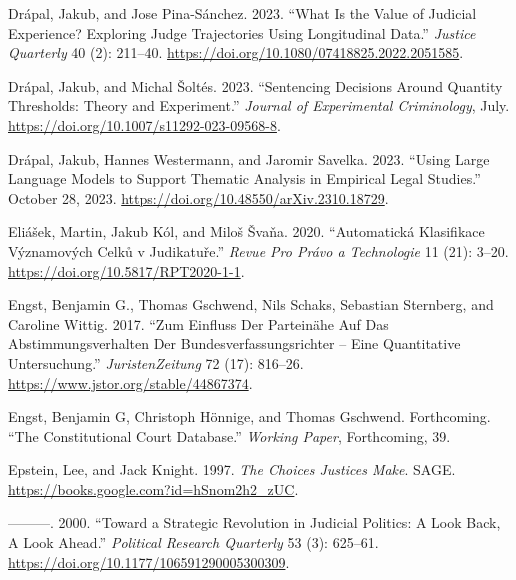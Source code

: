 \documentclass[
  11pt,
]{article}
\newlength{\cslhangindent}
\newenvironment{CSLReferences}[2] %
 {%
  \setlength{\parindent}{0pt}
  \ifodd #1 \everypar{\setlength{\hangindent}{\cslhangindent}}\ignorespaces\fi
  \ifnum #2 > 0
  \setlength{\parskip}{#2\baselineskip}
  \fi
 }%
 {}
\begin{document}
\begin{CSLReferences}{1}{0}
\leavevmode{}%
Drápal, Jakub, and Jose Pina-Sánchez. 2023. {``What Is the {Value} of
{Judicial Experience}? {Exploring Judge Trajectories Using Longitudinal
Data}.''} \emph{Justice Quarterly} 40 (2): 211--40.
\url{https://doi.org/10.1080/07418825.2022.2051585}.

\leavevmode{}%
Drápal, Jakub, and Michal Šoltés. 2023. {``Sentencing Decisions Around
Quantity Thresholds: Theory and Experiment.''} \emph{Journal of
Experimental Criminology}, July.
\url{https://doi.org/10.1007/s11292-023-09568-8}.

\leavevmode{}%
Drápal, Jakub, Hannes Westermann, and Jaromir Savelka. 2023. {``Using
{Large Language Models} to {Support Thematic Analysis} in {Empirical
Legal Studies}.''} October 28, 2023.
\url{https://doi.org/10.48550/arXiv.2310.18729}.

\leavevmode{}%
Eliášek, Martin, Jakub Kól, and Miloš Švaňa. 2020. {``Automatická
Klasifikace Významových Celků v Judikatuře.''} \emph{Revue Pro Právo a
Technologie} 11 (21): 3--20. \url{https://doi.org/10.5817/RPT2020-1-1}.

\leavevmode{}%
Engst, Benjamin G., Thomas Gschwend, Nils Schaks, Sebastian Sternberg,
and Caroline Wittig. 2017. {``Zum {Einfluss} Der {Parteinähe} Auf Das
{Abstimmungsverhalten} Der {Bundesverfassungsrichter} -- Eine
Quantitative {Untersuchung}.''} \emph{JuristenZeitung} 72 (17): 816--26.
\url{https://www.jstor.org/stable/44867374}.

\leavevmode{}%
Engst, Benjamin G, Christoph Hönnige, and Thomas Gschwend. Forthcoming.
{``The {Constitutional Court Database}.''} \emph{Working Paper},
Forthcoming, 39.

\leavevmode{}%
Epstein, Lee, and Jack Knight. 1997. \emph{The {Choices Justices Make}}.
{SAGE}. \url{https://books.google.com?id=hSnom2h2_zUC}.

\leavevmode{}%
---------. 2000. {``Toward a {Strategic Revolution} in {Judicial
Politics}: {A Look Back}, {A Look Ahead}.''} \emph{Political Research
Quarterly} 53 (3): 625--61.
\url{https://doi.org/10.1177/106591290005300309}.


\end{CSLReferences}
\end{document}
